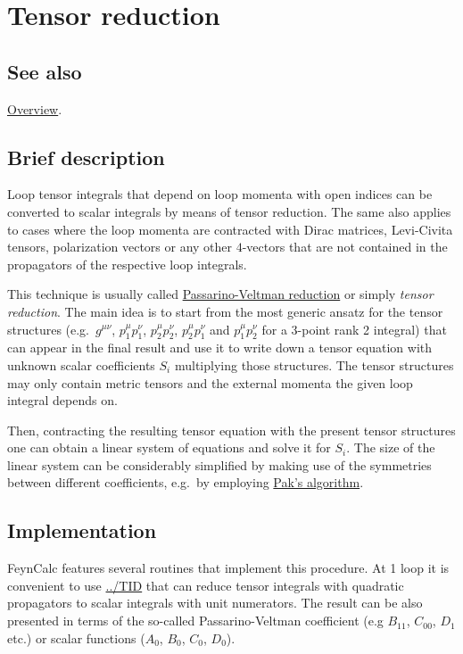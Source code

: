 \documentclass[../FeynCalcManual.tex]{subfiles}
\begin{document}
\hypertarget{tensor reduction}{
\section{Tensor reduction}\label{tensor reduction}}

\subsection{See also}

\hyperlink{toc}{Overview}.

\subsection{Brief description}\label{brief-description}

Loop tensor integrals that depend on loop momenta with open indices can
be converted to scalar integrals by means of tensor reduction. The same
also applies to cases where the loop momenta are contracted with Dirac
matrices, Levi-Civita tensors, polarization vectors or any other
\(4\)-vectors that are not contained in the propagators of the
respective loop integrals.

This technique is usually called
\href{https://doi.org/10.1016/0550-3213(79)90234-7\%7D}{Passarino-Veltman
reduction} or simply \emph{tensor reduction}. The main idea is to start
from the most generic ansatz for the tensor structures
(e.g.~\(g^{\mu \nu}\), \(p_1^\mu p_1^\nu\), \(p_2^\mu p_2^\nu\),
\(p_2^\mu p_1^\nu\) and \(p_1^\mu p_2^\nu\) for a 3-point rank 2
integral) that can appear in the final result and use it to write down a
tensor equation with unknown scalar coefficients \(S_i\) multiplying
those structures. The tensor structures may only contain metric tensors
and the external momenta the given loop integral depends on.

Then, contracting the resulting tensor equation with the present tensor
structures one can obtain a linear system of equations and solve it for
\(S_i\). The size of the linear system can be considerably simplified by
making use of the symmetries between different coefficients, e.g.~by
employing \href{https://arxiv.org/pdf/1111.0868}{Pak's algorithm}.

\subsection{Implementation}\label{implementation}

FeynCalc features several routines that implement this procedure. At 1
loop it is convenient to use \hyperlink{../tid}{../TID} that can reduce
tensor integrals with quadratic propagators to scalar integrals with
unit numerators. The result can be also presented in terms of the
so-called Passarino-Veltman coefficient (e.g \(B_{11}\), \(C_{00}\),
\(D_{1}\) etc.) or scalar functions (\(A_0\), \(B_0\), \(C_0\),
\(D_0\)).
\end{document}
